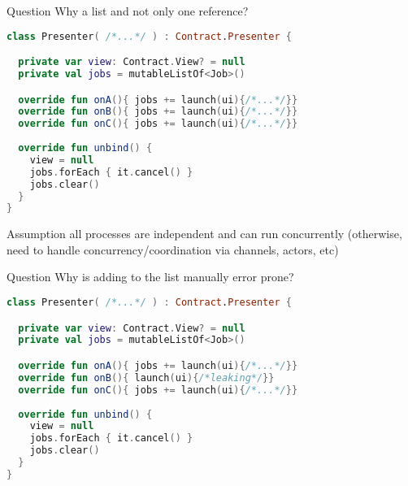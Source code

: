 \documentclass[10pt]{beamer}
\begin{document}
\begin{frame}[fragile]
	\begin{alertblock}{Question}
Why a list and not only one reference?
\end{alertblock}
\end{frame}
\begin{frame}[fragile]
\begin{lstlisting}[language=Kotlin, basicstyle=\ttfamily]
class Presenter( /*...*/ ) : Contract.Presenter {

  private var view: Contract.View? = null
  private val jobs = mutableListOf<Job>()

  override fun onA(){ jobs += launch(ui){/*...*/}}
  override fun onB(){ jobs += launch(ui){/*...*/}}
  override fun onC(){ jobs += launch(ui){/*...*/}}
  
  override fun unbind() {
    view = null
    jobs.forEach { it.cancel() } 
    jobs.clear() 
  }
}
\end{lstlisting}
\end{frame}

\begin{frame}[fragile]
	\begin{alertblock}{Assumption}
all processes are independent and can run concurrently (otherwise, need to handle concurrency/coordination via channels, actors, etc) 
\end{alertblock}
\end{frame}
\begin{frame}[fragile]
	\begin{alertblock}{Question}
Why is adding to the list manually error prone?
\end{alertblock}
\end{frame}

\begin{frame}[fragile]
\begin{lstlisting}[language=Kotlin, basicstyle=\ttfamily]
class Presenter( /*...*/ ) : Contract.Presenter {

  private var view: Contract.View? = null
  private val jobs = mutableListOf<Job>()

  override fun onA(){ jobs += launch(ui){/*...*/}}
  override fun onB(){ launch(ui){/*leaking*/}}
  override fun onC(){ jobs += launch(ui){/*...*/}}
  
  override fun unbind() {
    view = null
    jobs.forEach { it.cancel() } 
    jobs.clear() 
  }
}
\end{lstlisting}
\end{frame}
\end{document}
